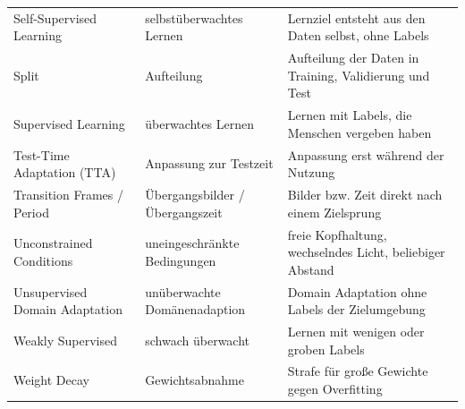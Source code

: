 {\begin{longtable}{@{}L{4.1cm}L{3.8cm}>{\raggedright\arraybackslash}p{\dimexpr\textwidth-7.9cm-4\tabcolsep\relax}@{}}
  Self-Supervised Learning & selbstüberwachtes Lernen & Lernziel entsteht aus den Daten selbst, ohne Labels \\
  Split & Aufteilung & Aufteilung der Daten in Training, Validierung und Test \\
  Supervised Learning & überwachtes Lernen & Lernen mit Labels, die Menschen vergeben haben \\
  Test-Time Adaptation (TTA) & Anpassung zur Testzeit & Anpassung erst während der Nutzung \\
  Transition Frames / Period & Übergangsbilder / Übergangszeit & Bilder bzw. Zeit direkt nach einem Zielsprung \\
  Unconstrained Conditions & uneingeschränkte Bedingungen & freie Kopfhaltung, wechselndes Licht, beliebiger Abstand \\
  Unsupervised Domain Adaptation & unüberwachte Domänenadaption & Domain Adaptation ohne Labels der Zielumgebung \\
  Weakly Supervised & schwach überwacht & Lernen mit wenigen oder groben Labels \\
  Weight Decay & Gewichtsabnahme & Strafe für große Gewichte gegen Overfitting \\
\end{longtable}}
